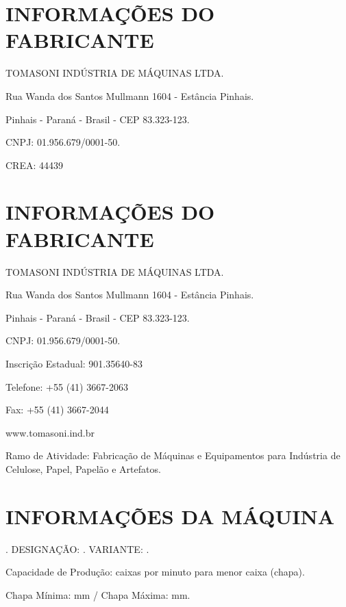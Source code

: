 \thispagestyle{fancy}

\vspace*{40 pt}

\section{\large{INFORMAÇÕES DO FABRICANTE}}

TOMASONI INDÚSTRIA DE MÁQUINAS LTDA.

Rua Wanda dos Santos Mullmann 1604 - Estância Pinhais.

Pinhais - Paraná - Brasil - CEP 83.323-123.

CNPJ: 01.956.679/0001-50.

CREA: 44439


\section{\large{INFORMAÇÕES DO FABRICANTE}}

TOMASONI INDÚSTRIA DE MÁQUINAS LTDA.

Rua Wanda dos Santos Mullmann 1604 - Estância Pinhais.

Pinhais - Paraná - Brasil - CEP 83.323-123.

CNPJ: 01.956.679/0001-50.

Inscrição Estadual: 901.35640-83

Telefone: +55 (41) 3667-2063

Fax: +55 (41) 3667-2044

www.tomasoni.ind.br

Ramo de Atividade: Fabricação de Máquinas e Equipamentos para Indústria de Celulose, Papel, Papelão e Artefatos.


\newpage

\thispagestyle{fancy}

\vspace*{40 pt}

\section{\large{INFORMAÇÕES DA MÁQUINA}}

\machineName \space. DESIGNAÇÃO: \machineShortName. VARIANTE: \variant.

Capacidade de Produção: \productionCapacityminimumSheet \space caixas por minuto para menor caixa (chapa).

Chapa Mínima: \minimumSheet mm / Chapa Máxima: \maximumSheet mm.

